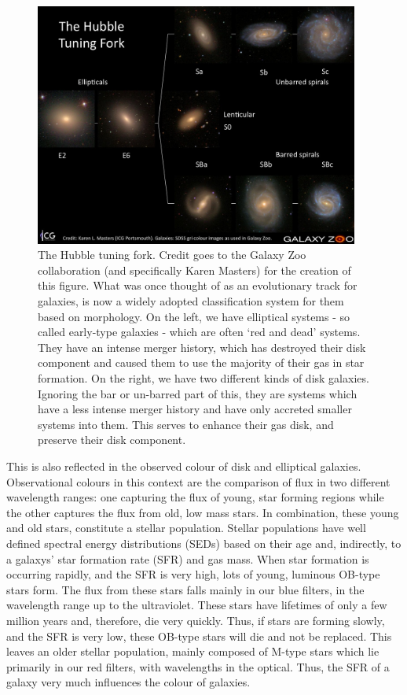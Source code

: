 \begin{figure}
    \centering
    \includegraphics[width=0.95\textwidth]{Introduction/figures/hubble-tuning-fork.jpg}
    \caption{The Hubble tuning fork. Credit goes to the Galaxy Zoo collaboration (and specifically Karen Masters) for the creation of this figure. What was once thought of as an evolutionary track for galaxies, is now a widely adopted classification system for them based on morphology. On the left, we have elliptical systems - so called early-type galaxies - which are often `red and dead' systems. They have an intense merger history, which has destroyed their disk component and caused them to use the majority of their gas in star formation. On the right, we have two different kinds of disk galaxies. Ignoring the bar or un-barred part of this, they are systems which have a less intense merger history and have only accreted smaller systems into them. This serves to enhance their gas disk, and preserve their disk component.}
    \label{fig:hubble-tuning}
\end{figure}

This is also reflected in the observed colour of disk and elliptical galaxies. Observational colours in this context are the comparison of flux in two different wavelength ranges: one capturing the flux of young, star forming regions while the other captures the flux from old, low mass stars. In combination, these young and old stars, constitute a stellar population. Stellar populations have well defined spectral energy distributions (SEDs) based on their age and, indirectly, to a galaxys' star formation rate (SFR) and gas mass. When star formation is occurring rapidly, and the SFR is very high, lots of young, luminous OB-type stars form. The flux from these stars falls mainly in our blue filters, in the wavelength range up to the ultraviolet. These stars have lifetimes of only a few million years and, therefore, die very quickly. Thus, if stars are forming slowly, and the SFR is very low, these OB-type stars will die and not be replaced. This leaves an older stellar population, mainly composed of M-type stars which lie primarily in our red filters, with wavelengths in the optical. Thus, the SFR of a galaxy very much influences the colour of galaxies.

